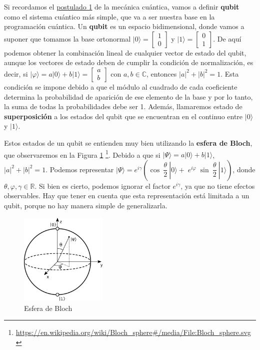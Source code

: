  Si recordamos el \hyperref[Postulado1]{postulado 1} de la mecánica cuántica, vamos a definir \textbf{qubit} como el sistema cuántico más simple, que va a ser nuestra base en la programación cuántica. Un \textbf{qubit} es un espacio bidimensional, donde vamos a suponer que tomamos la base ortonormal $|0 \rangle = \begin{bmatrix} 1\\0 \end{bmatrix}$ y $|1 \rangle = \begin{bmatrix} 0\\1 \end{bmatrix}$. De aquí podemos obtener la combinación lineal de cualquier vector de estado del qubit, aunque los vectores de estado deben de cumplir la condición de normalización, es decir, si $|\varphi \rangle = a |0\rangle + b |1\rangle = \begin{bmatrix} a\\b \end{bmatrix}$ con $a,b \in \mathbb{C}$, entonces $|a|^{2}+|b|^{2}=1$. Esta condición se impone debido a que el módulo al cuadrado de cada coeficiente determina la probabilidad de aparición de ese elemento de la base y por lo tanto, la suma de todas la probabilidades debe ser 1. Además, llamaremos estado de \textbf{superposición} a los estados del qubit que se encuentran en el continuo entre $|0\rangle$ y $|1\rangle$.\newline

 Estos estados de un qubit se entienden muy bien utilizando la \textbf{esfera de Bloch}, que observaremos en la Figura \ref{Fig:Bloch} \footnote{\url{https://en.wikipedia.org/wiki/Bloch\_sphere\#/media/File:Bloch\_sphere.svg}}. Debido a que si $|\Psi \rangle = a |0\rangle + b |1\rangle$, $|a|^{2}+|b|^{2}=1$. Podemos representar $|\Psi \rangle = e^{i\gamma}\left( \cos\:\dfrac{\theta}{2} \:|0\rangle +\; e^{i\varphi}\;\sin\:\dfrac{\theta}{2}\:|1\rangle\right)$, donde $\theta,\varphi,\gamma \in \mathbb{R}$. Si bien es cierto, podemos ignorar el factor $e^{i\gamma}$, ya que no tiene efectos observables. Hay que tener en cuenta que esta representación está limitada a un qubit, porque no hay manera simple de generalizarla.

  \begin{figure}[H]
    \centering
    \includegraphics[width=0.37\textwidth]{TFG/imagenes/Bloch_sphere.png}
    \caption{Esfera de Bloch} 
    \label{Fig:Bloch}
  \end{figure}
 

